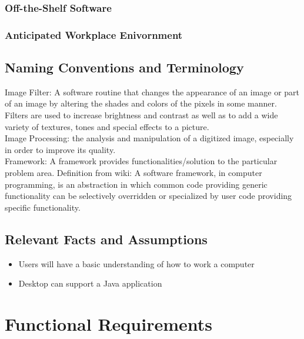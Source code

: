 \documentclass[12pt, titlepage]{article}
\begin{document}
\subsubsection{Off-the-Shelf Software}
\subsubsection{Anticipated Workplace Enivornment}









\subsection{Naming Conventions and Terminology}

Image Filter: A software routine that changes the appearance of an image or part of an image by altering the shades and colors of the pixels in some manner. Filters are used to increase brightness and contrast as well as to add a wide variety of textures, tones and special effects to a picture.\\

Image Processing: the analysis and manipulation of a digitized image, especially in order to improve its quality.\\

Framework: A framework provides functionalities/solution to the particular problem area. Definition from wiki: A software framework, in computer programming, is an abstraction in which common code providing generic functionality can be selectively overridden or specialized by user code providing specific functionality.


\subsection{Relevant Facts and Assumptions}

\begin{itemize}
  \item Users will have a basic understanding of how to work a computer
  \item Desktop can support a Java application
\end{itemize}

\section{Functional Requirements}
\end{document}
